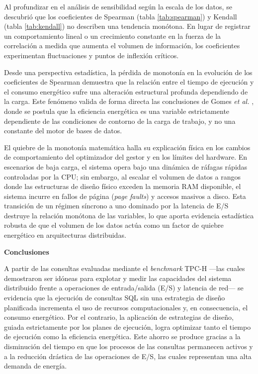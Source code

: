 \documentclass[12pt, letter paper]{report}
\begin{document}
      Al profundizar en el análisis de sensibilidad según la escala de los
      datos, se descubrió que los coeficientes de Spearman (tabla
      \ref{tab:spearman}) y Kendall (tabla \ref{tab:kendall}) no describen una
      tendencia monótona. En lugar de registrar un comportamiento lineal o un
      crecimiento constante en la fuerza de la correlación a medida que aumenta
      el volumen de información, los coeficientes experimentan fluctuaciones y
      puntos de inflexión críticos.

      Desde una perspectiva estadística, la pérdida de monotonía en la evolución
      de los coeficientes de Spearman demuestra que la relación entre el tiempo
      de ejecución y el consumo energético sufre una alteración estructural
      profunda dependiendo de la carga. Este fenómeno valida de forma directa
      las conclusiones de Gomes \textit{et al.} \cite{gomesenergy2016}, donde se
      postula que la eficiencia energética es una variable estrictamente
      dependiente de las condiciones de contorno de la carga de trabajo, y no
      una constante del motor de bases de datos.

      El quiebre de la monotonía matemática halla su explicación física en los
      cambios de comportamiento del optimizador del gestor y en los límites del
      hardware. En escenarios de baja carga, el sistema opera bajo una dinámica
      de ráfagas rápidas controladas por la CPU; sin embargo, al escalar el
      volumen de datos a rangos donde las estructuras de diseño físico exceden
      la memoria RAM disponible, el sistema incurre en fallos de página
      (\textit{page faults}) y accesos masivos a disco. Esta transición de un
      régimen síncrono a uno dominado por la latencia de E/S destruye la
      relación monótona de las variables, lo que aporta evidencia estadística
      robusta de que el volumen de los datos actúa como un factor de quiebre
      energético en arquitecturas distribuidas.

  \newpage
  \begin{center}
    \Large \textbf{Conclusiones}
  \end{center}

  A partir de las consultas evaluadas mediante el \textit{benchmark} TPC-H —las
  cuales demostraron ser idóneas para explotar y medir las capacidades del
  sistema distribuido frente a operaciones de entrada/salida (E/S) y latencia de
  red— se evidencia que la ejecución de consultas SQL sin una estrategia de
  diseño planificada incrementa el uso de recursos computacionales y, en
  consecuencia, el consumo energético. Por el contrario, la aplicación de
  estrategias de diseño, guiada estrictamente por los planes de ejecución, logra
  optimizar tanto el tiempo de ejecución como la eficiencia energética. Este
  ahorro se produce gracias a la disminución del tiempo en que los procesos de
  las consultas permanecen activos y a la reducción drástica de las operaciones
  de E/S, las cuales representan una alta demanda de energía.
\end{document}

